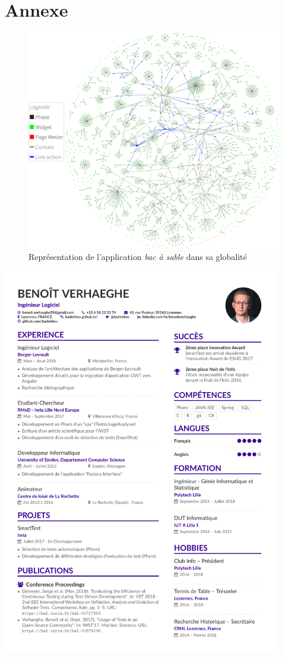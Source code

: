 \hypertarget{annexe}{%
\section{Annexe}\label{annexe}}

\begin{figure}
\hypertarget{firework}{%
\centering
\includegraphics{figures/firework.png}
\caption{Représentation de l'application \emph{bac à sable} dans sa
globalité}\label{firework}
}
\end{figure}

\includegraphics[width=0.9\textwidth,height=\textheight]{cv/cv.pdf}
\newpage

